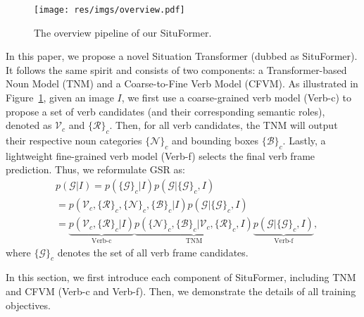\documentclass[letterpaper]{article} \usepackage{aaai22}  \usepackage{times}  \usepackage{helvet}  \usepackage{courier}  \usepackage[hyphens]{url}  \usepackage{graphicx} \urlstyle{rm} \def\UrlFont{\rm}  \usepackage{natbib}  \usepackage{caption} \DeclareCaptionStyle{ruled}{labelfont=normalfont,labelsep=colon,strut=off} \frenchspacing  \setlength{\pdfpagewidth}{8.5in}  \setlength{\pdfpageheight}{11in}
\begin{document}
\begin{figure}[t]
    \centering
    \texttt{[image: res/imgs/overview.pdf]}
    \caption{The overview pipeline of our SituFormer.}
    \label{fig:overview}
\end{figure}

In this paper, we propose a novel Situation Transformer (dubbed as SituFormer). It follows the same spirit and consists of two components: a Transformer-based Noun Model (TNM) and a Coarse-to-Fine Verb Model (CFVM). As illustrated in Figure~\ref{fig:overview}, given an image $I$, we first use a coarse-grained verb model (Verb-c) to propose a set of verb candidates (and their corresponding semantic roles), denoted as $\mathcal{V}_c$ and $\{\mathcal{R}\}_c$. Then, for all verb candidates, the TNM will output their respective noun categories $\{\mathcal{N}\}_c$ and bounding boxes $\{\mathcal{B}\}_c$. Lastly, a lightweight fine-grained verb model (Verb-f) selects the final verb frame prediction. Thus, we reformulate GSR as:
\begin{equation}
    \begin{aligned} \label{equ:2}
    & p(\mathcal{G} | I) = p (\{\mathcal{G}\}_c | I) p(\mathcal{G} |\{\mathcal{G}\}_c,I) \nonumber \\
    & =  p(\mathcal{V}_c, \{\mathcal{R}\}_c, \{\mathcal{N} \}_c, \{\mathcal{B}\}_c| I) p(\mathcal{G} |\{\mathcal{G}\}_c,I) \\
    & = 
    \underbrace{p(\mathcal{V}_c, \{\mathcal{R}\}_c| I)}_{\text{Verb-c}}
    \underbrace{p(\{\mathcal{N} \}_c, \{\mathcal{B}\}_c|\mathcal{V}_c, \{\mathcal{R}\}_c, I)}_{\text{TNM}}
    \underbrace{p(\mathcal{G} |\{\mathcal{G}\}_c,I) \nonumber}_{\text{Verb-f}},
\end{aligned}
\end{equation}
where $\{\mathcal{G}\}_c$ denotes the set of all verb frame candidates.

In this section, we first introduce each component of SituFormer, including TNM and CFVM (Verb-c and Verb-f). Then, we demonstrate the details of all training objectives.
\end{document}
